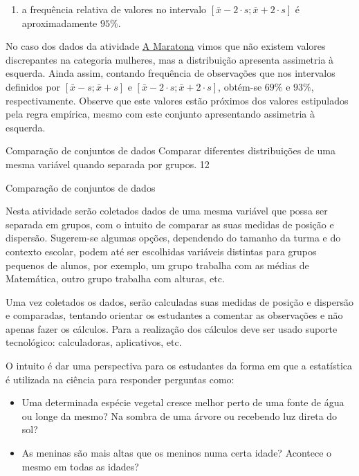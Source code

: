 {{{\begin{enumerate}
\item {} 
a frequência relativa de valores no intervalo \([\bar{x}-2\cdot s; \bar{x}+2\cdot s]\) é aproximadamente $95\%$.

\end{enumerate}

No caso dos dados da atividade \hyperref[\detokenize{PE104-0:ativ-maratona-de-ny}]{A Maratona} vimos que não existem valores discrepantes na categoria mulheres, mas a distribuição apresenta assimetria à esquerda. Ainda assim, contando frequência de observações que nos intervalos definidos por \([\bar{x}-s;\bar{x}+s]\) e  \([\bar{x}-2\cdot s; \bar{x}+2\cdot s]\),  obtém-se $69\%$ e $93\%$, respectivamente. Observe que este valores estão próximos dos valores estipulados pela regra empírica, mesmo com este conjunto apresentando assimetria à esquerda.


\clearpage

\def\currentcolor{session2}
\begin{objectives}{Comparação de conjuntos de dados}
{
Comparar diferentes distribuições de uma mesma variável quando separada por grupos.
}{1}{2}
\end{objectives}

\begin{sugestions}{Comparação de conjuntos de dados}
{
Nesta atividade serão coletados dados de uma mesma variável que possa ser separada em grupos, com o intuito de comparar as suas medidas de posição e dispersão. Sugerem-se algumas opções, dependendo do tamanho da turma e do contexto escolar, podem até ser escolhidas variáveis distintas para grupos pequenos de alunos, por exemplo, um grupo trabalha com as médias de Matemática, outro grupo trabalha com alturas, etc.

Uma vez coletados os dados, serão calculadas suas medidas de posição e dispersão e comparadas, tentando orientar os estudantes a comentar as observações e não apenas fazer os cálculos. Para a realização dos cálculos deve ser usado suporte tecnológico: calculadoras, aplicativos, etc.

O intuito é dar uma perspectiva para os estudantes da forma em que a estatística é utilizada na ciência para responder perguntas como:

\begin{itemize}
\item Uma determinada espécie vegetal cresce melhor perto de uma fonte de água ou longe da mesmo? Na sombra de uma árvore ou recebendo luz direta do sol?
\item As meninas são mais altas que os meninos numa certa idade? Acontece o mesmo em todas as idades?
\end{itemize}

}
\end{sugestions}}}}
